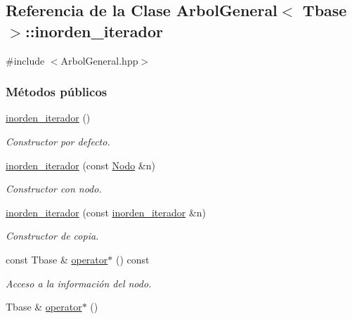 \hypertarget{classArbolGeneral_1_1inorden__iterador}{\subsection{Referencia de la Clase Arbol\-General$<$ Tbase $>$\-:\-:inorden\-\_\-iterador}
\label{classArbolGeneral_1_1inorden__iterador}
}


{\ttfamily \#include $<$Arbol\-General.\-hpp$>$}

\subsubsection*{Métodos públicos}
\begin{DoxyCompactItemize}
\item 
\hyperlink{classArbolGeneral_1_1inorden__iterador_aff58cfa3f1c33c0c9c8c08f1d0f3cc8f}{inorden\-\_\-iterador} ()
\begin{DoxyCompactList}\small\item\em Constructor por defecto. \end{DoxyCompactList}\item 
\hyperlink{classArbolGeneral_1_1inorden__iterador_a6ddfc67535be2870b508633b75639698}{inorden\-\_\-iterador} (const \hyperlink{classArbolGeneral_a12cc1b74a9095d89bc7334290d332f7a}{Nodo} \&n)
\begin{DoxyCompactList}\small\item\em Constructor con nodo. \end{DoxyCompactList}\item 
\hyperlink{classArbolGeneral_1_1inorden__iterador_a35353196b9e723891d499a54ac19f8de}{inorden\-\_\-iterador} (const \hyperlink{classArbolGeneral_1_1inorden__iterador}{inorden\-\_\-iterador} \&n)
\begin{DoxyCompactList}\small\item\em Constructor de copia. \end{DoxyCompactList}\item 
const Tbase \& \hyperlink{classArbolGeneral_1_1inorden__iterador_a55ebf97a02cdd84aae4905676e064b68}{operator$\ast$} () const 
\begin{DoxyCompactList}\small\item\em Acceso a la información del nodo. \end{DoxyCompactList}\item 
Tbase \& \hyperlink{classArbolGeneral_1_1inorden__iterador_a566d603aa2bbca6c429031785497b116}{operator$\ast$} ()

\end{DoxyCompactItemize}
